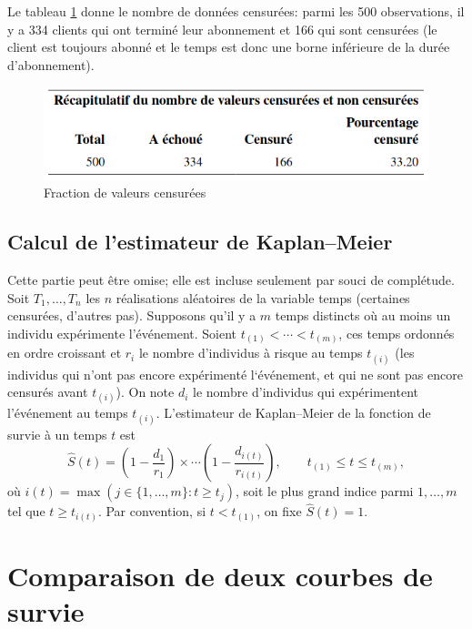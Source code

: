 \documentclass[
  11pt,
  letterpaper,
]{book}
\theoremstyle{definition}
\theoremstyle{definition}
\theoremstyle{definition}
\theoremstyle{definition}
\theoremstyle{remark}
\begin{document}
Le tableau \ref{fig:fig5-e5} donne le nombre de données censurées: parmi les 500 observations, il y a 334 clients qui ont terminé leur abonnement et 166 qui sont censurées (le client est toujours abonné et le temps est donc une borne inférieure de la durée d'abonnement).

\begin{figure}

{\centering \includegraphics[width=0.6\linewidth]{figures/05-survie-e5} 

}

\caption{Fraction de valeurs censurées}\label{fig:fig5-e5}
\end{figure}

\hypertarget{calcul-de-lestimateur-de-kaplanmeier}{%
\subsection{Calcul de l'estimateur de Kaplan--Meier}\label{calcul-de-lestimateur-de-kaplanmeier}}

Cette partie peut être omise; elle est incluse seulement par souci de complétude. Soit \(T_1, \ldots, T_n\) les \(n\) réalisations aléatoires de la variable temps (certaines censurées, d'autres pas). Supposons qu'il y a \(m\) temps distincts où au moins un individu expérimente l'événement. Soient \(t_{(1)} < \cdots < t_{(m)}\), ces temps ordonnés en ordre croissant et \(r_i\) le nombre d'individus à risque au temps \(t_{(i)}\) (les individus qui n'ont pas encore expérimenté l`événement, et qui ne sont pas encore censurés avant \(t_{(i)}\)). On note \(d_i\) le nombre d'individus qui expérimentent l'événement au temps \(t_{(i)}\). L'estimateur de Kaplan--Meier de la fonction de survie à un temps \(t\) est
\[ \widehat{S}(t) = \left( 1- \frac{d_1}{r_1}\right) \times \cdots \left( 1- \frac{d_{i(t)}}{r_{i(t)}}\right), \qquad t_{(1)} \leq t \leq t_{(m)},
\]
où \(i(t) =\max(j \in \{1, \ldots, m\}: t \geq t_{j})\), soit le plus grand indice parmi \(1, \ldots, m\) tel que \(t \geq t_{i(t)}\). Par convention, si \(t < t_{(1)}\), on fixe \(\widehat{S}(t)=1\).

\hypertarget{comparaison-de-deux-courbes-de-survie}{%
\section{Comparaison de deux courbes de survie}\label{comparaison-de-deux-courbes-de-survie}}
\end{document}
